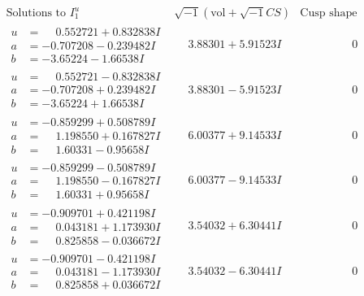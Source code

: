 \documentclass[1p]{elsarticle_modified}
\theoremstyle{definition}
\newcommand{\I}{\sqrt{-1}}
\begin{document}
$$\begin{array}{c|c|c}  
\text{Solutions to }I^u_{1}& \I (\text{vol} + \sqrt{-1}CS) & \text{Cusp shape}\\
 \hline 
\begin{aligned}
u &= \phantom{-}0.552721 + 0.832838 I \\
a &= -0.707208 - 0.239482 I \\
b &= -3.65224 - 1.66538 I\end{aligned}
 & \phantom{-}3.88301 + 5.91523 I & \phantom{-0.000000 } 0 \\ \hline\begin{aligned}
u &= \phantom{-}0.552721 - 0.832838 I \\
a &= -0.707208 + 0.239482 I \\
b &= -3.65224 + 1.66538 I\end{aligned}
 & \phantom{-}3.88301 - 5.91523 I & \phantom{-0.000000 } 0 \\ \hline\begin{aligned}
u &= -0.859299 + 0.508789 I \\
a &= \phantom{-}1.198550 + 0.167827 I \\
b &= \phantom{-}1.60331 - 0.95658 I\end{aligned}
 & \phantom{-}6.00377 + 9.14533 I & \phantom{-0.000000 } 0 \\ \hline\begin{aligned}
u &= -0.859299 - 0.508789 I \\
a &= \phantom{-}1.198550 - 0.167827 I \\
b &= \phantom{-}1.60331 + 0.95658 I\end{aligned}
 & \phantom{-}6.00377 - 9.14533 I & \phantom{-0.000000 } 0 \\ \hline\begin{aligned}
u &= -0.909701 + 0.421198 I \\
a &= \phantom{-}0.043181 + 1.173930 I \\
b &= \phantom{-}0.825858 - 0.036672 I\end{aligned}
 & \phantom{-}3.54032 + 6.30441 I & \phantom{-0.000000 } 0 \\ \hline\begin{aligned}
u &= -0.909701 - 0.421198 I \\
a &= \phantom{-}0.043181 - 1.173930 I \\
b &= \phantom{-}0.825858 + 0.036672 I\end{aligned}
 & \phantom{-}3.54032 - 6.30441 I & \phantom{-0.000000 } 0 \\ \hline\begin{aligned}

\end{aligned}
\end{array}$$
\end{document}
